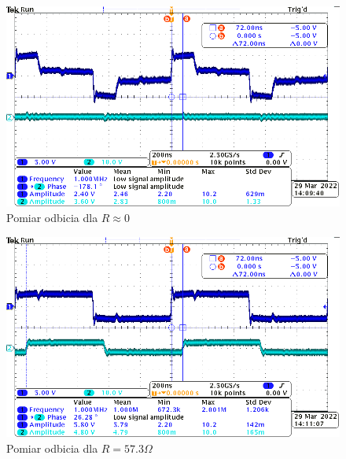 \begin{figure}[H]
	\centering
	\includegraphics[width=\textwidth]{include/5/0R.png}
	\caption{Pomiar odbicia dla \(R\approx0\)}
\end{figure}

\begin{figure}[H]
	\centering
	\includegraphics[width=\textwidth]{include/5/57.3R.png}
	\caption{Pomiar odbicia dla \(R=57.3\Omega\)}
\end{figure}

